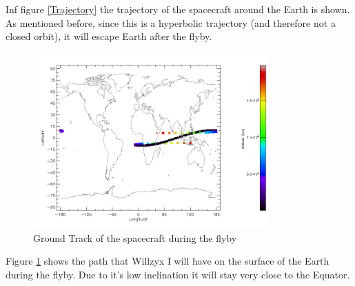 Inf figure \ref{Trajectory} the trajectory of the spacecraft around the Earth is shown. As mentioned before, since this is a hyperbolic trajectory (and therefore not a closed orbit), it will escape Earth after the flyby.

\begin{figure}[h!]
\centering
\includegraphics[width=0.8\textwidth]{figures/GroundTrack.png}
\caption{Ground Track of the spacecraft during the flyby}
\label{GroundTrack}
\end{figure}

Figure \ref{GroundTrack} shows the path that Willzyx I will have on the surface of the Earth during the flyby. Due to it's low inclination it will stay very close to the Equator.
